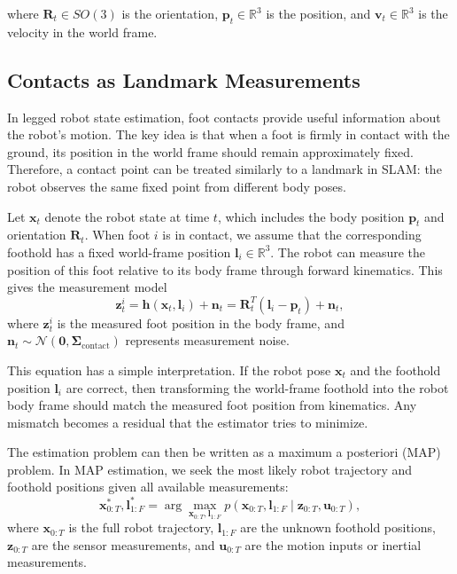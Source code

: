 \documentclass[conference]{IEEEtran}
\begin{document}
where $\mathbf{R}_t \in SO(3)$ is the orientation, $\mathbf{p}_t \in \mathbb{R}^3$ is the position, and $\mathbf{v}_t \in \mathbb{R}^3$ is the velocity in the world frame.

\subsection{Contacts as Landmark Measurements}

In legged robot state estimation, foot contacts provide useful information about the robot's motion. 
The key idea is that when a foot is firmly in contact with the ground, its position in the world frame 
should remain approximately fixed. Therefore, a contact point can be treated similarly to a landmark in 
SLAM: the robot observes the same fixed point from different body poses.

Let $\mathbf{x}_t$ denote the robot state at time $t$, which includes the body position 
$\mathbf{p}_t$ and orientation $\mathbf{R}_t$. When foot $i$ is in contact, we assume that the 
corresponding foothold has a fixed world-frame position $\mathbf{l}_i \in \mathbb{R}^3$. The robot 
can measure the position of this foot relative to its body frame through forward kinematics. This gives 
the measurement model
\begin{equation}
\mathbf{z}_{t}^{i} 
= \mathbf{h}(\mathbf{x}_t, \mathbf{l}_i) + \mathbf{n}_t
= \mathbf{R}_t^T(\mathbf{l}_i - \mathbf{p}_t) + \mathbf{n}_t ,
\label{eq:contact_measurement}
\end{equation}
where $\mathbf{z}_{t}^{i}$ is the measured foot position in the body frame, and 
$\mathbf{n}_t \sim \mathcal{N}(\mathbf{0}, \boldsymbol{\Sigma}_{\text{contact}})$ represents 
measurement noise.

This equation has a simple interpretation. If the robot pose $\mathbf{x}_t$ and the foothold position 
$\mathbf{l}_i$ are correct, then transforming the world-frame foothold into the robot body frame should 
match the measured foot position from kinematics. Any mismatch becomes a residual that the estimator 
tries to minimize.

The estimation problem can then be written as a maximum a posteriori (MAP) problem. In MAP estimation, 
we seek the most likely robot trajectory and foothold positions given all available measurements:
\begin{equation}
\mathbf{x}^*_{0:T}, \mathbf{l}^*_{1:F}
=
\arg\max_{\mathbf{x}_{0:T}, \mathbf{l}_{1:F}}
p(\mathbf{x}_{0:T}, \mathbf{l}_{1:F} \mid \mathbf{z}_{0:T}, \mathbf{u}_{0:T}),
\end{equation}
where $\mathbf{x}_{0:T}$ is the full robot trajectory, $\mathbf{l}_{1:F}$ are the unknown foothold 
positions, $\mathbf{z}_{0:T}$ are the sensor measurements, and $\mathbf{u}_{0:T}$ are the motion inputs 
or inertial measurements.
\end{document}
